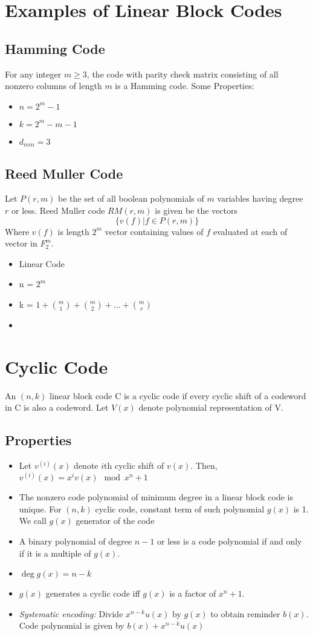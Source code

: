 \documentclass[a4paper]{article}
\theoremstyle{dotless}
\theoremstyle{dotless}
\theoremstyle{remark}
\begin{document}
\section{Examples of Linear Block Codes}
\subsection{Hamming Code}
For any integer $m \geq 3$, the code with parity check matrix consisting of all nonzero columns of length $m$ is a Hamming code. Some Properties:
\begin{itemize}
\item $n = 2^m - 1$
\item $k = 2^m - m -1$
\item $d_{min} = 3$
\end{itemize}

\subsection{Reed Muller Code}
Let $P(r,m)$ be the set of all boolean polynomials of $m$ variables having degree $r$ or less. Reed Muller code $RM(r,m)$ is given be the vectors \[\{v(f) | f \in P(r,m) \}\]
Where $v(f)$ is length $2^m$ vector containing values of $f$ evaluated at each of vector in $F_2^m$.
\begin{itemize}
\item Linear Code
\item n = $2^m$
\item k = $1 + {m\choose 1}+{m\choose 2}+\dots+{m\choose r}$
\item  {}
\end{itemize}


\section{Cyclic Code}
An $(n,k)$ linear block code C is a cyclic code if every cyclic shift of a codeword in C is also a codeword. Let $V(x)$ denote polynomial representation of V.
\subsection{Properties}
\begin{itemize}
\item Let $v^{(i)}(x)$ denote $i$th cyclic shift of $v(x)$. Then, $v^{(i)}(x) = x^iv(x)\mod{x^n+1}$
\item The nonzero code polynomial of minimum degree in a linear block code is unique. For $(n,k)$ cyclic code, constant term of such polynomial $g(x)$ is 1. We call $g(x)$ generator of the code
\item A binary polynomial of degree $n-1$ or less is a code polynomial if and only if it is a multiple of $g(x)$.
\item $\deg{g(x)} = n-k$
\item $g(x)$ generates a cyclic code iff $g(x)$ is a factor of $x^n + 1$.
\item \emph{Systematic encoding:} Divide $x^{n-k}u(x)$ by $g(x)$ to obtain reminder $b(x)$. Code polynomial is given by $b(x) + x^{n-k}u(x)$
\end{itemize}
\end{document}
